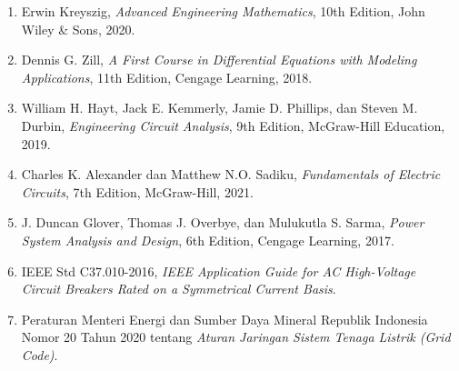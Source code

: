 \documentclass[11pt,a4paper]{article}
\theoremstyle{definition}
\begin{document}
\begin{enumerate}[leftmargin=*]
    \item Erwin Kreyszig, \textit{Advanced Engineering Mathematics}, 10th Edition, John Wiley \& Sons, 2020.
    \item Dennis G. Zill, \textit{A First Course in Differential Equations with Modeling Applications}, 11th Edition, Cengage Learning, 2018.
    \item William H. Hayt, Jack E. Kemmerly, Jamie D. Phillips, dan Steven M. Durbin, \textit{Engineering Circuit Analysis}, 9th Edition, McGraw-Hill Education, 2019.
    \item Charles K. Alexander dan Matthew N.O. Sadiku, \textit{Fundamentals of Electric Circuits}, 7th Edition, McGraw-Hill, 2021.
    \item J. Duncan Glover, Thomas J. Overbye, dan Mulukutla S. Sarma, \textit{Power System Analysis and Design}, 6th Edition, Cengage Learning, 2017.
    \item IEEE Std C37.010-2016, \textit{IEEE Application Guide for AC High-Voltage Circuit Breakers Rated on a Symmetrical Current Basis}.
    \item Peraturan Menteri Energi dan Sumber Daya Mineral Republik Indonesia Nomor 20 Tahun 2020 tentang \textit{Aturan Jaringan Sistem Tenaga Listrik (Grid Code)}.
\end{enumerate}
\end{document}
